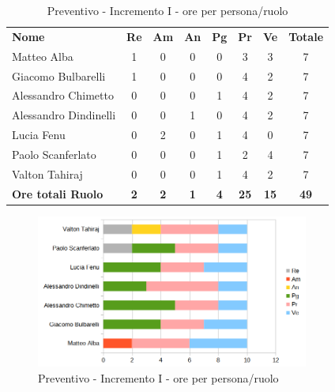 	\begin{table} [h!]
	\begin{center}
		\begin{tabular} { m{3.5cm} c c c c c c c }
			\rowcolor{lightgray}
			\textbf{Nome} & \textbf{Re} & \textbf{Am} & \textbf{An} & \textbf{Pg} & \textbf{Pr} & \textbf{Ve} & \textbf{Totale} \\
			Matteo Alba & 1 & 0 & 0 & 0 & 3 & 3 & 7 \\
			Giacomo Bulbarelli & 1 & 0 & 0 & 0 & 4 & 2 & 7 \\
			Alessandro Chimetto & 0 & 0 & 0 & 1 & 4 & 2 & 7 \\
			Alessandro Dindinelli & 0 & 0 & 1 & 0 & 4 & 2 & 7 \\
			Lucia Fenu & 0 & 2 & 0 & 1 & 4 & 0 & 7 \\
			Paolo Scanferlato & 0 & 0 & 0 & 1 & 2 & 4 & 7 \\
			Valton Tahiraj & 0 & 0 & 0 & 1 & 4 & 2 & 7 \\
			\textbf{Ore totali Ruolo} & \textbf{2} & \textbf{2} & \textbf{1} & \textbf{4} & \textbf{25}& \textbf{15} & \textbf{49}
		\end{tabular}
		\caption{Preventivo - Incremento I - ore per persona/ruolo}
	\end{center}
\end{table}
	\begin{figure} [h!]
	\centering
	\includegraphics[width=0.8\textwidth]{res/img/preventivi/1e2-barre.png}
	\caption{Preventivo - Incremento I - ore per persona/ruolo} 
\end{figure}

\newpage

